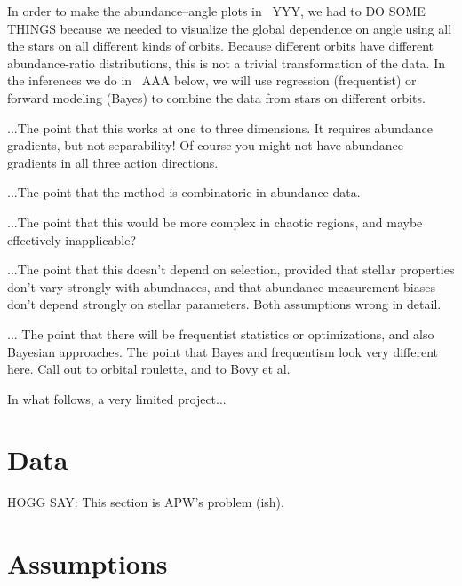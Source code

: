\documentclass[modern]{aastex63}
\begin{document}
In order to make the abundance--angle plots in \figurename~YYY, we had
to DO SOME THINGS because we needed to visualize the global dependence
on angle using all the stars on all different kinds of orbits.
Because different orbits have different abundance-ratio
distributions, this is not a trivial transformation of the data.
In the inferences we do in \sectionname~AAA below, we
will use regression (frequentist) or forward modeling (Bayes) to
combine the data from stars on different orbits.

...The point that this works at one to three dimensions. It requires
abundance gradients, but not separability!  Of course you might not
have abundance gradients in all three action directions.

...The point that the method is combinatoric in abundance data.

...The point that this would be more complex in chaotic regions, and
maybe effectively inapplicable?

...The point that this doesn't depend on selection, provided that
stellar properties don't vary strongly with abundnaces, and that
abundance-measurement biases don't depend strongly on stellar
parameters. Both assumptions wrong in detail.

... The point that there will be frequentist statistics or
optimizations, and also Bayesian approaches.  The point that Bayes and
frequentism look very different here. Call out to orbital roulette,
and to Bovy et al.

In what follows, a very limited project...

\section{Data}

HOGG SAY: This section is APW's problem (ish).

\section{Assumptions}
\end{document}
